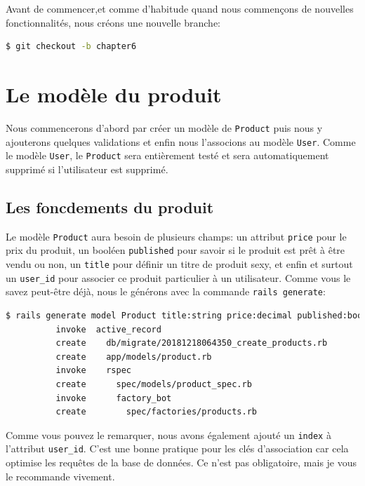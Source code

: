 \documentclass[]{report}
\begin{document}
  Avant de commencer,et comme d'habitude quand nous commençons de nouvelles fonctionnalités, nous créons une nouvelle branche:

  \begin{scriptsize}
    \begin{lstlisting}[language=bash]
    $ git checkout -b chapter6
    \end{lstlisting}
  \end{scriptsize}

  \section{Le modèle du produit}

    Nous commencerons d'abord par créer un modèle de \verb|Product| puis nous y ajouterons quelques validations et enfin nous l'associons au modèle \verb|User|. Comme le modèle \verb|User|, le \verb|Product| sera entièrement testé et sera automatiquement supprimé si l'utilisateur est supprimé.

    \subsection{Les foncdements du produit}

      Le modèle \verb|Product| aura besoin de plusieurs champs: un attribut \verb|price| pour le prix du produit, un booléen \verb|published| pour savoir si le produit est prêt à être vendu ou non, un \verb|title| pour définir un titre de produit sexy, et enfin et surtout un \verb|user_id| pour associer ce produit particulier à un utilisateur. Comme vous le savez peut-être déjà, nous le générons avec la commande \verb|rails generate|:

      \begin{scriptsize}
        \begin{lstlisting}[language=bash]
        $ rails generate model Product title:string price:decimal published:boolean user_id:integer:index
          invoke  active_record
          create    db/migrate/20181218064350_create_products.rb
          create    app/models/product.rb
          invoke    rspec
          create      spec/models/product_spec.rb
          invoke      factory_bot
          create        spec/factories/products.rb
        \end{lstlisting}
      \end{scriptsize}

      Comme vous pouvez le remarquer, nous avons également ajouté un \verb|index| à l'attribut \verb|user_id|. C'est une bonne pratique pour les clés d'association car cela optimise les requêtes de la base de données. Ce n'est pas obligatoire, mais je vous le recommande vivement.
\end{document}
